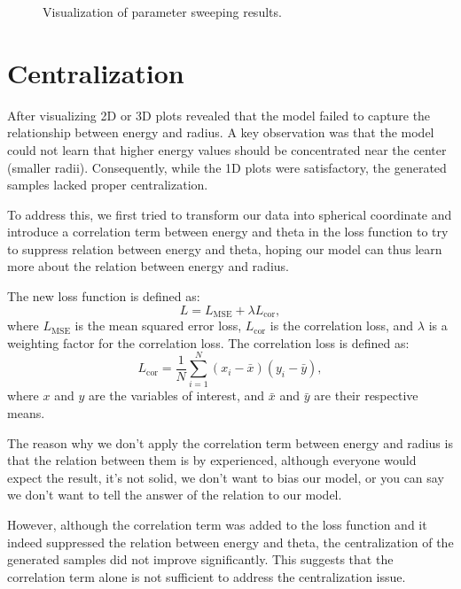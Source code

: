\begin{figure}[h!]
    \centering
    \caption{Visualization of parameter sweeping results.}
\end{figure}


\section{Centralization}
After visualizing 2D or 3D plots revealed that the model failed to capture the relationship between energy and radius. A key observation was that the model could not learn that higher energy values should be concentrated near the center (smaller radii). Consequently, while the 1D plots were satisfactory, the generated samples lacked proper centralization.

To address this, we first tried to transform our data into spherical coordinate and introduce a correlation term between energy and theta in the loss function to try to suppress relation between energy and theta, hoping our model can thus learn more about the relation between energy and radius. 

The new loss function is defined as:
\begin{equation}
    L = L_{\text{MSE}} + \lambda L_{\text{cor}},
\end{equation}
where $L_{\text{MSE}}$ is the mean squared error loss, $L_{\text{cor}}$ is the correlation loss, and $\lambda$ is a weighting factor for the correlation loss. The correlation loss is defined as:
\begin{equation}
    L_{\text{cor}} = \frac{1}{N} \sum_{i=1}^{N} (x_i - \bar{x})(y_i - \bar{y}),
\end{equation}
where $x$ and $y$ are the variables of interest, and $\bar{x}$ and $\bar{y}$ are their respective means.

The reason why we don't apply the correlation term between energy and radius is that the relation between them is by experienced, although everyone would expect the result, it's not solid, we don't want to bias our model, or you can say we don't want to tell the answer of the relation to our model. 

However, although the correlation term was added to the loss function and it indeed suppressed the relation between energy and theta, the centralization of the generated samples did not improve significantly. This suggests that the correlation term alone is not sufficient to address the centralization issue.

